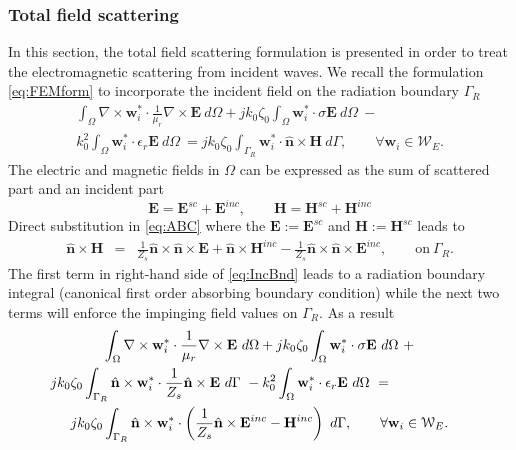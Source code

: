 \subsubsection{Total field scattering}

In this section, the total field scattering formulation is presented in order to treat the electromagnetic scattering from incident waves. We recall the formulation \eqref{eq:FEMform} to incorporate the incident field on the radiation boundary $\Gamma_R$
\begin{multline}
\label{eq:FEMformScatt1}
\int_\Omega \nabla \times \mathbf{w}_i^* \cdot \frac{1}{\mu_r} \nabla \times \mathbf{E} \ d\Omega +
 j k_0 \zeta_0 \int_\Omega \mathbf{w}_i^* \cdot \sigma \mathbf{E} \ d\Omega \ - \\ 
 k_0^2 \int_\Omega \mathbf{w}_i^* \cdot \epsilon_r \mathbf{E} \ d\Omega \ = 
 j k_0 \zeta_0 \int_{\Gamma_{R}} \mathbf{w}_i^* \cdot \hat{\mathbf{n}} \times \mathbf{H} \ d\Gamma, \qquad \forall \mathbf{w}_i \in \mathcal{W}_E.
\end{multline}
%
\noindent The electric and magnetic fields in $\Omega$ can be expressed as the sum of scattered part and an incident part
$$\mathbf{E} = \mathbf{E}^{sc} + \mathbf{E}^{inc}, \qquad \mathbf{H} = \mathbf{H}^{sc} + \mathbf{H}^{inc} $$
\noindent Direct substitution in \eqref{eq:ABC} where the $\mathbf{E} := \mathbf{E}^{sc}$ and $\mathbf{H} := \mathbf{H}^{sc}$ leads to
\begin{eqnarray}
\label{eq:IncBnd}
\hat{\mathbf{n}} \times \mathbf{H} & = & \frac{1}{Z_s} \hat{\mathbf{n}} \times \hat{\mathbf{n}} \times \mathbf{E} + \hat{\mathbf{n}} \times \mathbf{H}^{inc} - \frac{1}{Z_s} \hat{\mathbf{n}} \times \hat{\mathbf{n}} \times \mathbf{E}^{inc}, \qquad \mathrm{on} \ \Gamma_{R}.
\end{eqnarray}
\noindent The first term in right-hand side of \eqref{eq:IncBnd} leads to a radiation boundary integral (canonical first order absorbing boundary condition) while the next two terms will enforce the impinging field values on $\Gamma_R$. As a result
\begin{multline}
\label{eq:FEMformScatt}
\int_\Omega \nabla \times \mathbf{w}_i^* \cdot \frac{1}{\mu_r} \nabla \times \mathbf{E} \ d\Omega + j k_0 \zeta_0 \int_\Omega \mathbf{w}_i^* \cdot \sigma \mathbf{E} \ d\Omega \ + \\
\hspace{-2cm} j k_0 \zeta_0 \int_{\mathrm{\Gamma}_R} \hat{\mathbf{n}} \times \mathbf{w}_i^* \cdot \frac{1}{Z_s} \hat{\mathbf{n}} \times \mathbf{E} \ d\mathrm{\Gamma} \ - 
 k_0^2 \int_\Omega \mathbf{w}_i^* \cdot \epsilon_r \mathbf{E} \ d\Omega \ = \\
 j k_0 \zeta_0 \int_{\Gamma_{R}} \hat{\mathbf{n}} \times \mathbf{w}_i^* \cdot \left( \frac{1}{Z_s} \hat{\mathbf{n}} \times \mathbf{E}^{inc} - \mathbf{H}^{inc} \right) \ d\Gamma, \qquad \forall \mathbf{w}_i \in \mathcal{W}_E.
\end{multline}

